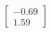 \documentclass[preview]{standalone}
\begin{document}
\begin{align*}
\begin{bmatrix} -0.69 \\ 1.59 \end{bmatrix}
\end{align*}
\end{document}
